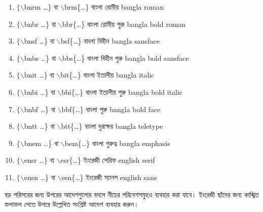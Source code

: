 \documentclass[a4paper,10pt,xetex]{article}
\begin{document}
\begin{enumerate}
\item $\{\backslash$bnrm \ldots\} বা $\backslash$brm\{\ldots\}  {\bnrm বাংলা রোমীয় bangla roman} 
\item $\{\backslash$bnbr \ldots\} বা $\backslash$bbr\{\ldots\} {\bnbr বাংলা র‌োমীয় পুরু bangla bold roman}
\item $\{\backslash$bnsf \ldots\} বা $\backslash$bsf\{\ldots\} {\bnsf বাংলা বিহীন bangla sansface}
\item $\{\backslash$bnbs \ldots\} বা $\backslash$bbs\{\ldots\} {\bnbs বাংলা বিহীন পুরু bangla bold sansface}
\item $\{\backslash$bnit \ldots\} বা $\backslash$bit\{\ldots\} {\bnit বাংলা ইতালীয় bangla italic}
\item $\{\backslash$bnbi \ldots\} বা $\backslash$bbi\{\ldots\} {\bnbi বাংলা ইতালীয় পুরু bangla bold italic}
\item $\{\backslash$bnbf \ldots\} বা $\backslash$bbf\{\ldots\} {\bnbf বাংলা পুরু bangla bold face}
\item $\{\backslash$bntt \ldots\} বা $\backslash$btt\{\ldots\} {\bntt বাংলা দুরাক্ষর bangla teletype}
\item $\{\backslash$bnem \ldots\} বা $\backslash$bem\{\ldots\} {\bnem বাংলা গুরুত্ব bangla emphasis}
\item $\{\backslash$ensr \ldots\} বা $\backslash$‌esr\{\ldots\} {\ensr ইংরেজী সেরিফ english serif}
\item $\{\backslash$ensn \ldots\} বা $\backslash$esn\{\ldots\} {\ensn ইংরেজী স্যানস english sans}
\end{enumerate}

\vspace{1em}
\par\noindent বড় পরিসরের জন্য উপরের আদেশগুলোর বদলে নীচের পরিবেশসমুহও ব্যবহার করা যাবে। ইংরেজী ছাঁদের জন্য কাঙ্খিত ফলাফল পেতে উপরে উল্লেখিত সংশ্লিষ্ট আদেশ ব্যবহার করুন।
\end{document}
